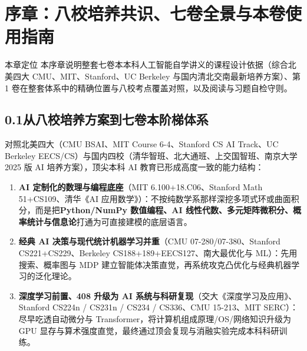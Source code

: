 \chapter*{序章：八校培养共识、七卷全景与本卷使用指南}

\begin{chapIntro}{本章定位}
本序章说明整套七卷本本科人工智能自学讲义的课程设计依据（综合北美四大 CMU、MIT、Stanford、UC Berkeley 与国内清北交南最新培养方案）、第 1 卷在整套体系中的精确位置与八校考点覆盖对照，以及阅读与习题自检守则。
\end{chapIntro}

\section*{0.1\quad 从八校培养方案到七卷本阶梯体系}

对照北美四大（CMU BSAI、MIT Course 6-4、Stanford CS AI Track、UC Berkeley EECS/CS）与国内四校（清华智班、北大通班、上交国智班、南京大学 2025 版 AI 培养方案），顶尖本科 AI 教育已形成高度一致的能力结构：
\begin{enumerate}
  \item \textbf{AI 定制化的数理与编程底座}（MIT 6.100+18.C06、Stanford Math 51+CS109、清华《AI 应用数学》）：不按纯数学系那样深挖多项式环或曲面积分，而是把\textbf{Python/NumPy 数值编程、AI 线性代数、多元矩阵微积分、概率统计与信息论}打通为可直接建模的底层语言。
  \item \textbf{经典 AI 决策与现代统计机器学习并重}（CMU 07-280/07-380、Stanford CS221+CS229、Berkeley CS188+189+EECS127、南大最优化与 ML）：先用搜索、概率图与 MDP 建立智能体决策直觉，再系统攻克凸优化与经典机器学习的泛化理论。
  \item \textbf{深度学习前置、408 升级为 AI 系统与科研复现}（交大《深度学习及应用》、Stanford CS224n / CS231n / CS234 / CS336、CMU 15-213、MIT SERC）：尽早吃透自动微分与 Transformer，将计算机组成原理/OS/网络知识升级为 GPU 显存与算术强度直觉，最终通过顶会复现与消融实验完成本科科研训练。
\end{enumerate}

